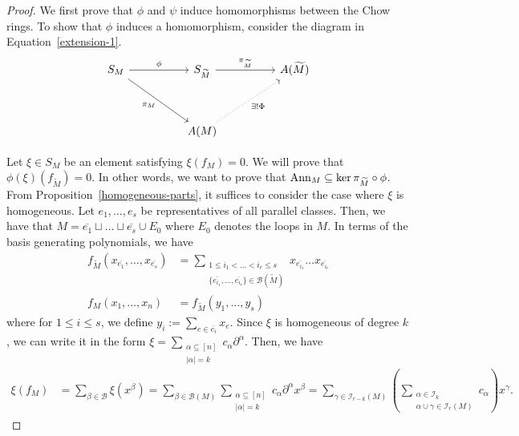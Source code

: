 \documentclass{puthesis-UG}
\begin{document}
\begin{proof}
	We first prove that $\phi$ and $\psi$ induce homomorphisms between the Chow rings. To show that $\phi$ induces a homomorphism, consider the diagram in Equation~\ref{extension-1}.
	\begin{equation} \label{extension-1}
			\begin{tikzcd}
				{S_M} && {S_{\widetilde{M}}} && {A(\widetilde{M})} \\
				\\
				&& {A(M)}
				\arrow["\phi", from=1-1, to=1-3]
				\arrow["{\pi_{\widetilde{M}}}", from=1-3, to=1-5]
				\arrow["{\pi_M}"', from=1-1, to=3-3]
				\arrow["{\exists ! \Phi}"', dotted, from=3-3, to=1-5]
			\end{tikzcd}
	\end{equation}
		

Let $\xi \in S_M$ be an element satisfying $\xi (f_M) = 0$. We will prove that $\phi(\xi) (f_{\widetilde{M}}) = 0$. In other words, we want to prove that $\operatorname{Ann}_M \subseteq \ker \pi_{\widetilde{M}} \circ \phi$. From Proposition~\ref{homogeneous-parts}, it suffices to consider the case where $\xi$ is homogeneous. Let $e_1, \ldots, e_s$ be representatives of all parallel classes. Then, we have that $M = \overline{e_1} \sqcup \ldots \sqcup \overline{e_s} \cup E_0$ where $E_0$ denotes the loops in $M$. In terms of the basis generating polynomials, we have 
\begin{align*}
	f_{\widetilde{M}}(x_{\overline{e_1}}, \ldots, x_{\overline{e_s}}) & = \sum_{\substack{1 \leq i_1 < \ldots < i_r \leq s \\ \{\overline{e_{i_1}}, \ldots, \overline{e_{i_r}}\} \in \mathcal{B}(\widetilde{M})}} x_{\overline{e_{i_1}}} \ldots x_{\overline{e_{i_r}}} \\ 
	f_M(x_1, \ldots, x_n) & = f_{\widetilde{M}} \left ( y_1, \ldots, y_s \right )
\end{align*}
where for $1 \leq i \leq s$, we define $y_i := \sum_{e \in \overline{e_i}} x_e$. Since $\xi$ is homogeneous of degree $k$, we can write it in the form $\xi = \sum_{\substack{\alpha \subseteq [n] \\ |\alpha| = k}} c_\alpha \partial^\alpha$. Then, we have 
\begin{align} \label{karen}
	\xi (f_M) & = \sum_{\beta \in \mathcal{B}} \xi (x^\beta) = \sum_{\beta \in \mathcal{B}(M)} \sum_{\substack{\alpha \subseteq [n] \\ |\alpha| = k}} c_\alpha \partial^\alpha x^\beta = \sum_{\gamma \in \mathcal{I}_{r-k}(M)} \left ( \sum_{ \substack{\alpha \in \mathcal{I}_k \\ \alpha \cup \gamma \in \mathcal{I}_r(M)}} c_\alpha  \right ) x^\gamma. 
\end{align}


\end{proof}
\end{document}
